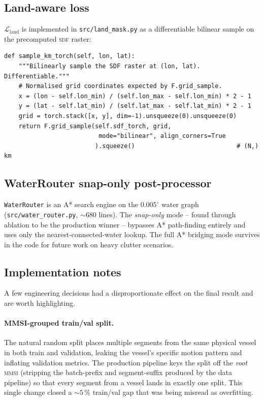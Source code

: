 \documentclass[11pt,a4paper]{article}
\newcommand{\sdf}{\textsc{sdf}}
\newcommand{\code}[1]{\texttt{\small #1}}
\begin{document}
\subsection{Land-aware loss}

$\mathcal{L}_{\mathrm{land}}$ is implemented in \code{src/land\_mask.py}
as a differentiable bilinear sample on the precomputed \sdf{} raster:

\begin{lstlisting}[caption={Differentiable land penalty (excerpt).},
                    label={lst:landloss}]
def sample_km_torch(self, lon, lat):
    """Bilinearly sample the SDF raster at (lon, lat). Differentiable."""
    # Normalised grid coordinates expected by F.grid_sample.
    x = (lon - self.lon_min) / (self.lon_max - self.lon_min) * 2 - 1
    y = (lat - self.lat_min) / (self.lat_max - self.lat_min) * 2 - 1
    grid = torch.stack([x, y], dim=-1).unsqueeze(0).unsqueeze(0)
    return F.grid_sample(self.sdf_torch, grid,
                          mode="bilinear", align_corners=True
                         ).squeeze()                            # (N,) km
\end{lstlisting}

\subsection{WaterRouter snap-only post-processor}

\code{WaterRouter} is an A* search engine on the $0.005^\circ$ water
graph (\code{src/water\_router.py}, $\sim$680 lines).  The
\emph{snap-only} mode -- found through ablation to be the production
winner -- bypasses A* path-finding entirely and uses only the
nearest-connected-water lookup.  The full A* bridging mode survives in
the code for future work on heavy clutter scenarios.

\subsection{Implementation notes}

A few engineering decisions had a disproportionate effect on the final
result and are worth highlighting.

\paragraph{MMSI-grouped train/val split.}
The natural random split places multiple segments from the same
physical vessel in both train and validation, leaking the vessel's
specific motion pattern and inflating validation metrics.  The
production pipeline keys the split off the \emph{root} \textsc{mmsi}
(stripping the batch-prefix and segment-suffix produced by the data
pipeline) so that every segment from a vessel lands in exactly one
split.  This single change closed a $\sim 5\,\%$ train/val gap that
was being misread as overfitting.
\end{document}
